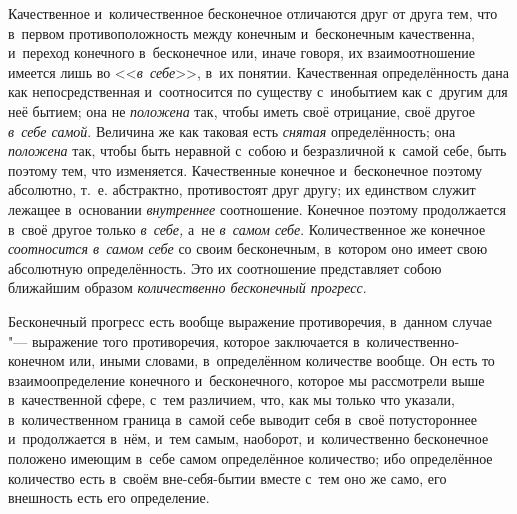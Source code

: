 Качественное и~количественное бесконечное отличаются друг от друга тем, что
в~первом противоположность между конечным и~бесконечным качественна, и~переход
конечного в~бесконечное или, иначе говоря, их взаимоотношение имеется лишь во
<<{\em в~себе}>>, в~их понятии. Качественная определённость дана как
непосредственная и~соотносится по существу с~инобытием как с~другим для неё
бытием; она не {\em положена} так, чтобы иметь своё отрицание, своё другое
{\em в~себе самой}. Величина же как таковая есть {\em снятая}
определённость; она {\em положена} так, чтобы быть неравной с~собою и
безразличной к~самой себе, быть поэтому тем, что изменяется. Качественные
конечное и~бесконечное поэтому абсолютно, т.~е. абстрактно, противостоят друг
другу; их единством служит лежащее в~основании {\em внутреннее} соотношение.
Конечное поэтому продолжается в~своё другое только {\em в~себе,} а~не
{\em в~самом себе}. Количественное же конечное {\em соотносится в~самом себе}
со своим бесконечным, в~котором оно имеет свою абсолютную определённость. Это
их соотношение представляет собою ближайшим образом
{\em количественно бесконечный прогресс}.


Бесконечный прогресс есть вообще выражение противоречия, в~данном случае "---
выражение того противоречия, которое заключается в~количественно-конечном или,
иными словами, в~определённом количестве вообще. Он есть то взаимоопределение
конечного и~бесконечного, которое мы рассмотрели выше в~качественной сфере,
с~тем различием, что, как мы только что указали, в~количественном граница
в~самой себе выводит себя в~своё потустороннее и~продолжается в~нём, и~тем
самым, наоборот, и~количественно бесконечное положено имеющим в~себе самом
определённое количество; ибо определённое количество есть в~своём
вне-себя-бытии вместе с~тем оно же само, его внешность есть его определение.

